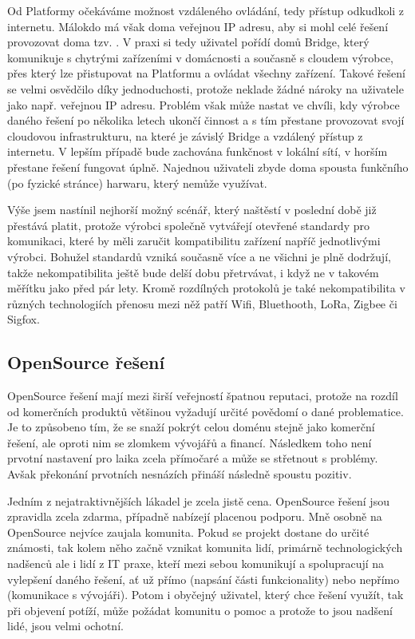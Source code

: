 Od Platformy očekáváme možnost vzdáleného ovládání, tedy přístup odkudkoli z internetu. Málokdo má však doma veřejnou IP adresu, aby si mohl celé řešení provozovat doma tzv. . V praxi si tedy uživatel pořídí domů Bridge, který komunikuje s chytrými zařízeními v domácnosti a současně s cloudem výrobce, přes který lze přistupovat na Platformu a ovládat všechny zařízení. Takové řešení se velmi osvědčilo díky jednoduchosti, protože neklade žádné nároky na uživatele jako např. veřejnou IP adresu. Problém však může nastat ve chvíli, kdy výrobce daného řešení po několika letech ukončí činnost a s tím přestane provozovat svojí cloudovou infrastrukturu, na které je závislý Bridge a vzdálený přístup z internetu. V lepším případě bude zachována funkčnost v lokální sítí, v horším přestane řešení fungovat úplně. Najednou uživateli zbyde doma spousta funkčního (po fyzické stránce) harwaru, který nemůže využívat.

Výše jsem nastínil nejhorší možný scénář, který naštěstí v poslední době již přestává platit, protože výrobci společně vytvářejí otevřené standardy pro komunikaci, které by měli zaručit kompatibilitu zařízení napříč jednotlivými výrobci. Bohužel standardů vzniká současně více a ne všichni je plně dodržují, takže nekompatibilita ještě bude delší dobu přetrvávat, i když ne v takovém měřítku jako před pár lety. Kromě rozdílných protokolů je také nekompatibilita v různých technologiích přenosu mezi něž patří Wifi, Bluethooth, LoRa, Zigbee či Sigfox.

\subsection{OpenSource řešení}
OpenSource řešení mají mezi širší veřejností špatnou reputaci, protože na rozdíl od komerčních  produktů většinou vyžadují určité povědomí o dané problematice. Je to způsobeno tím, že se snaží pokrýt celou doménu stejně jako komerční řešení, ale oproti nim se zlomkem vývojářů a financí. Následkem toho není prvotní nastavení pro laika zcela přímočaré a může se střetnout s problémy. Avšak překonání prvotních nesnázích přináší následně spoustu pozitiv.

Jedním z nejatraktivnějších lákadel je zcela jistě cena. OpenSource řešení jsou zpravidla zcela zdarma, případně nabízejí placenou podporu. Mně osobně na OpenSource nejvíce zaujala komunita. Pokud se projekt dostane do určité známosti, tak kolem něho začně vznikat komunita lidí, primárně technologických nadšenců ale i lidí z IT praxe, kteří mezi sebou komunikují a spolupracují na vylepšení daného řešení, ať už přímo (napsání části funkcionality) nebo nepřímo (komunikace s vývojáři). Potom i obyčejný uživatel, který chce řešení využít, tak při objevení potíží, může požádat komunitu o pomoc a protože to jsou nadšení lidé, jsou velmi ochotní.


